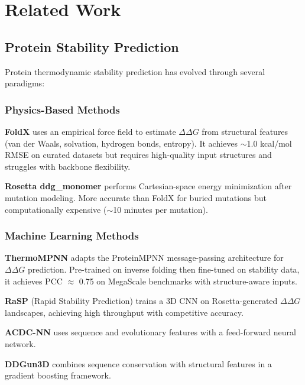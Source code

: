\chapter{Related Work}
\label{ch:related_work}

\section{Protein Stability Prediction}

Protein thermodynamic stability prediction has evolved through several paradigms:

\subsection{Physics-Based Methods}

\textbf{FoldX} \cite{schymkowitz2005foldx} uses an empirical force field to estimate $\Delta\Delta G$ from structural features (van der Waals, solvation, hydrogen bonds, entropy). It achieves $\sim$1.0 kcal/mol RMSE on curated datasets but requires high-quality input structures and struggles with backbone flexibility.

\textbf{Rosetta ddg\_monomer} \cite{kellogg2011role} performs Cartesian-space energy minimization after mutation modeling. More accurate than FoldX for buried mutations but computationally expensive ($\sim$10 minutes per mutation).

\subsection{Machine Learning Methods}

\textbf{ThermoMPNN} \cite{dieckhaus2024thermompnn} adapts the ProteinMPNN message-passing architecture for $\Delta\Delta G$ prediction. Pre-trained on inverse folding then fine-tuned on stability data, it achieves PCC $\approx$ 0.75 on MegaScale benchmarks with structure-aware inputs.

\textbf{RaSP} (Rapid Stability Prediction) \cite{blaabjerg2023rasp} trains a 3D CNN on Rosetta-generated $\Delta\Delta G$ landscapes, achieving high throughput with competitive accuracy.

\textbf{ACDC-NN} \cite{benevenuta2021acdc} uses sequence and evolutionary features with a feed-forward neural network.

\textbf{DDGun3D} \cite{montanucci2019ddgun} combines sequence conservation with structural features in a gradient boosting framework.

